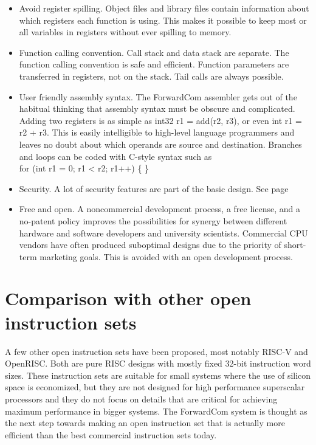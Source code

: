 \documentclass[forwardcom.tex]{subfiles}
\begin{document}
\begin{itemize}
\item Avoid register spilling. Object files and library files contain information about which registers each function is using. This makes it possible to keep most or all variables in registers without ever spilling to memory.

\item Function calling convention. Call stack and data stack are separate. The function calling convention is safe and efficient. Function parameters are transferred in registers, not on the stack. Tail calls are always possible.

\item User friendly assembly syntax. The ForwardCom assembler gets out of the habitual thinking that assembly syntax must be obscure and complicated. Adding two registers is as simple as {\ttfamily int32 r1 = add(r2, r3)}, or even {\ttfamily int r1 = r2 + r3}. This is easily intelligible to high-level language programmers and leaves no doubt about which operands are source and destination. 
Branches and loops can be coded with C-style syntax such as \\
{\ttfamily for (int r1 = 0; r1 < r2; r1++) \{  \} }

\item Security. A lot of security features are part of the basic design. 
See page \pageref{securityFeatures}

\item Free and open. A noncommercial development process, a free license, and a no-patent policy improves the possibilities for synergy between different hardware and software developers and university scientists. Commercial CPU vendors have often produced suboptimal designs due to the priority of short-term marketing goals. This is avoided with an open development process.

\end{itemize}
\vv


\section{Comparison with other open instruction sets}
A few other open instruction sets have been proposed, most notably RISC-V and OpenRISC. Both are pure RISC designs with mostly fixed 32-bit instruction word sizes. These instruction sets are suitable for small systems where the use of silicon space is economized, but they are not designed for high performance superscalar processors and they do not focus on details that are critical for achieving maximum performance in bigger systems. The ForwardCom system is thought as the next step towards making an open instruction set that is actually more efficient than the best commercial instruction sets today.
\vv
\end{document}
